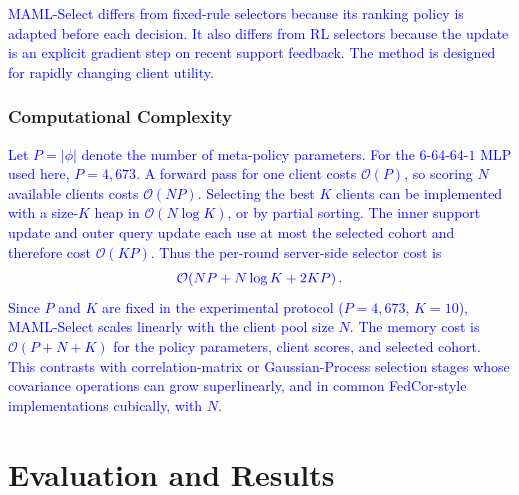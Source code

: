 \documentclass[journal]{IEEEtran}
\newcommand{\revision}[1]{\textcolor{blue}{#1}}
\begin{document}
\revision{MAML-Select differs from fixed-rule selectors because its ranking policy is adapted before each decision. It also differs from RL selectors because the update is an explicit gradient step on recent support feedback. The method is designed for rapidly changing client utility.}

\subsubsection{Computational Complexity}
\revision{Let $P=|\phi|$ denote the number of meta-policy parameters. For the $6$-$64$-$64$-$1$ MLP used here, $P=4{,}673$. A forward pass for one client costs $\mathcal{O}(P)$, so scoring $N$ available clients costs $\mathcal{O}(NP)$. Selecting the best $K$ clients can be implemented with a size-$K$ heap in $\mathcal{O}(N\log K)$, or by partial sorting. The inner support update and outer query update each use at most the selected cohort and therefore cost $\mathcal{O}(KP)$. Thus the per-round server-side selector cost is}
\begin{equation}
	\color{blue}
	\mathcal{O}\!\left(NP + N\log K + 2KP\right).
	\label{eq:selector_complexity}
\end{equation}
\revision{Since $P$ and $K$ are fixed in the experimental protocol ($P=4{,}673$, $K=10$), MAML-Select scales linearly with the client pool size $N$. The memory cost is $\mathcal{O}(P+N+K)$ for the policy parameters, client scores, and selected cohort. This contrasts with correlation-matrix or Gaussian-Process selection stages whose covariance operations can grow superlinearly, and in common FedCor-style implementations cubically, with $N$.}

\section{Evaluation and Results}
\end{document}
